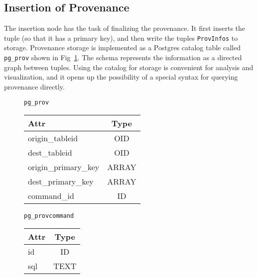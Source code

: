 \subsection{Insertion of Provenance}

The insertion node has the task of finalizing the provenance. It first inserts the tuple (so that it has a primary key), and then write the tuples \texttt{ProvInfos} to storage. Provenance storage is implemented as a Postgres catalog table called \texttt{pg\_prov} shown in Fig~\ref{pgprov}. The schema represents the information as a directed graph between tuples. Using the catalog for storage is convenient for analysis and visualization, and it opens up the possibility of a special syntax for querying provenance directly. 


\begin{figure}
  \centering
  \label{pgprov}
\texttt{pg\_prov}

\begin{tabular}{|lc|}
  \hline
  Attr & Type \\
  \hline
  origin\_tableid & OID \\
  dest\_tableid & OID \\
  origin\_primary\_key & ARRAY \\
  dest\_primary\_key & ARRAY \\
  command\_id & ID \\
  \hline
\end{tabular}

\texttt{pg\_provcommand}
\begin{tabular}{|lc|}
  \hline
  Attr & Type \\
  \hline
  id & ID \\
  sql & TEXT \\
  \hline  
\end{tabular}
\end{figure}
